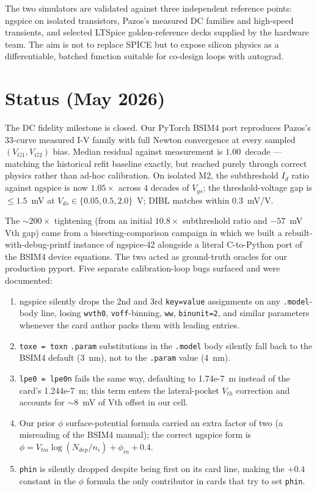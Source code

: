 \documentclass[fontsize=10pt]{article}
\begin{document}
The two simulators are validated against three independent reference points: ngspice on
isolated transistors, Pazos's measured DC families and high-speed transients, and selected
LTSpice golden-reference decks supplied by the hardware team. The aim is not to replace
SPICE but to expose silicon physics as a differentiable, batched function suitable for
co-design loops with autograd.

\section{Status (May 2026)}
The DC fidelity milestone is closed. Our PyTorch BSIM4 port reproduces Pazos's 33-curve
measured I-V family with full Newton convergence at every sampled $(V_{G1}, V_{G2})$ bias.
Median residual against measurement is $1.00$~decade — matching the historical refit
baseline exactly, but reached purely through correct physics rather than ad-hoc
calibration. On isolated M2, the subthreshold $I_d$ ratio against ngspice is now
$1.05\times$ across $4$ decades of $V_{gs}$; the threshold-voltage gap is
$\le 1.5$~mV at $V_{ds} \in \{0.05, 0.5, 2.0\}$~V; DIBL matches within $0.3$~mV/V.

The $\sim 200\times$ tightening (from an initial $10.8\times$ subthreshold ratio
and $-57$~mV Vth gap) came from a bisecting-comparison campaign in which we built a
rebuilt-with-debug-printf instance of ngspice-42 alongside a literal C-to-Python
port of the BSIM4 device equations. The two acted as ground-truth oracles for our
production pyport. Five separate calibration-loop bugs surfaced and were
documented:

\begin{enumerate}\setlength{\itemsep}{1pt}
  \item ngspice silently drops the 2nd and 3rd \texttt{key=value} assignments on
        any \texttt{.model}-body line, losing \texttt{wvth0}, \texttt{voff}-binning,
        \texttt{ww}, \texttt{binunit=2}, and similar parameters whenever the card
        author packs them with leading entries.
  \item \texttt{toxe = toxn} \texttt{.param} substitutions in the \texttt{.model}
        body silently fall back to the BSIM4 default (3~nm), not to the
        \texttt{.param} value (4~nm).
  \item \texttt{lpe0 = lpe0n} fails the same way, defaulting to 1.74e-7~m
        instead of the card's 1.244e-7~m; this term enters the lateral-pocket
        $V_{th}$ correction and accounts for $\sim 8$~mV of Vth offset in our cell.
  \item Our prior $\phi$ surface-potential formula carried an extra factor of two
        (a misreading of the BSIM4 manual); the correct ngspice form is
        $\phi = V_{tm} \log(N_{dep}/n_i) + \phi_{in} + 0.4$.
  \item \texttt{phin} is silently dropped despite being first on its card line,
        making the $+0.4$ constant in the $\phi$ formula the only contributor in
        cards that try to set \texttt{phin}.
\end{enumerate}
\end{document}
